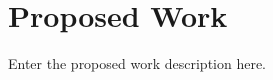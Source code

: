 \newpage
{}

\chapter{Proposed Work}
\label{chap:proposed}

Enter the proposed work description here.
